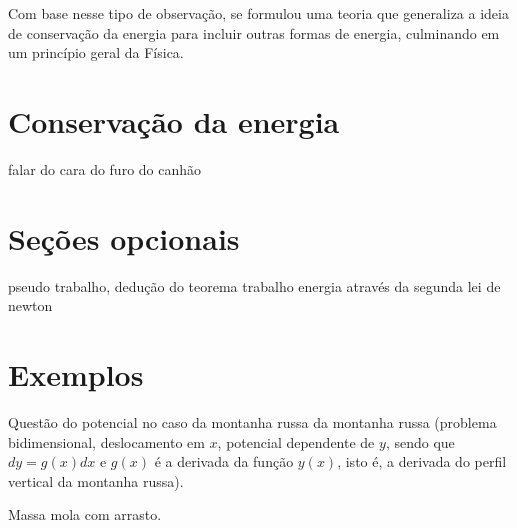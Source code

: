 Com base nesse tipo de observação, se formulou uma teoria que generaliza a ideia de conservação da energia para incluir outras formas de energia, culminando em um princípio geral da Física.
 

\section{Conservação da energia}

falar do cara do furo do canhão

\section{Seções opcionais}

pseudo trabalho, dedução do teorema trabalho energia através da segunda lei de newton

\section{Exemplos}

Questão do potencial no caso da montanha russa da montanha russa (problema bidimensional, deslocamento em $x$, potencial dependente de $y$, sendo que $dy = g(x) dx$ e $g(x)$ é a derivada da função $y(x)$, isto é, a derivada do perfil vertical da montanha russa).

Massa mola com arrasto.
